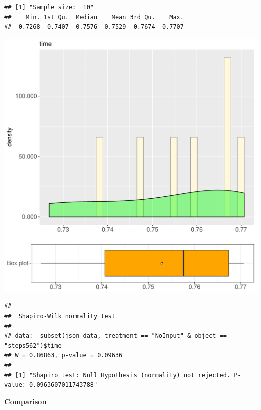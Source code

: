 \documentclass{article}\usepackage[]{graphicx}\usepackage[]{color}
\makeatletter
\def\maxwidth{ %
  \ifdim\Gin@nat@width>\linewidth
    \linewidth
  \else
    \Gin@nat@width
  \fi
}
\newenvironment{kframe}{%
 \def\at@end@of@kframe{}%
 \ifinner\ifhmode%
  \def\at@end@of@kframe{\end{minipage}}%
  \begin{minipage}{\columnwidth}%
 \fi\fi%
 \def\FrameCommand##1{\hskip\@totalleftmargin \hskip-\fboxsep
 \colorbox{shadecolor}{##1}\hskip-\fboxsep
     \hskip-\linewidth \hskip-\@totalleftmargin \hskip\columnwidth}%
 \MakeFramed {\advance\hsize-\width
   \@totalleftmargin\z@ \linewidth\hsize
   \@setminipage}}%
 {\par\unskip\endMakeFramed%
 \at@end@of@kframe}
\newenvironment{knitrout}{}{} %
\makeatother
\begin{document}
\begin{knitrout}
\color{fgcolor}\begin{kframe}
\begin{verbatim}
## [1] "Sample size:  10"
##    Min. 1st Qu.  Median    Mean 3rd Qu.    Max. 
##  0.7268  0.7407  0.7576  0.7529  0.7674  0.7707
\end{verbatim}
\end{kframe}
\includegraphics[width=\maxwidth]{figure/RH4_NoInput_steps562-1} 
\begin{kframe}\begin{verbatim}
## 
## 	Shapiro-Wilk normality test
## 
## data:  subset(json_data, treatment == "NoInput" & object == "steps562")$time
## W = 0.86863, p-value = 0.09636
## 
## [1] "Shapiro test: Null Hypothesis (normality) not rejected. P-value: 0.0963607011743788"
\end{verbatim}
\end{kframe}
\end{knitrout}
  
 \textbf{Comparison}
  
\end{document}
